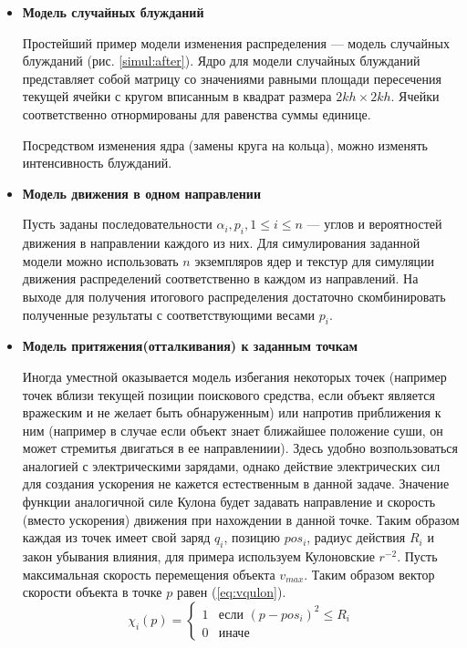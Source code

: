 \begin{itemize}
\item{
\textbf{Модель случайных блужданий}

Простейший пример модели изменения распределения --- модель случайных блужданий
(рис. \ref{simul:after}). Ядро для модели случайных блужданий представляет собой матрицу со
значениями равными площади пересечения текущей ячейки с кругом вписанным в квадрат размера
$2kh \times 2kh$. Ячейки соответственно отнормированы для равенства суммы единице.

Посредством изменения ядра (замены круга на кольца), можно изменять интенсивность блужданий.
}
\item{
\textbf{Модель движения в одном направлении}

Пусть заданы последовательности $\alpha_i, p_i, 1 \le i \le n$ --- углов и вероятностей
движения в направлении каждого из них. Для симулирования заданной модели можно
использовать $n$ экземпляров ядер и текстур для симуляции движения распределений
соответственно в каждом из направлений. На выходе для получения итогового распределения
достаточно скомбинировать полученные результаты с соответствующими весами $p_i$.
}
\item{
\textbf{Модель притяжения(отталкивания) к заданным точкам}

Иногда уместной оказывается модель избегания некоторых точек (например точек вблизи
текущей позиции поискового средства, если объект является вражеским и не желает быть
обнаруженным) или напротив приближения к ним (например в случае если объект знает ближайшее
положение суши, он может стремитья двигаться в ее направлениии). Здесь 
удобно возпользоваться аналогией с электрическими зарядами, однако действие электрических
сил для создания ускорения не кажется естественным в данной задаче. Значение функции
аналогичной силе Кулона будет задавать направление и скорость (вместо ускорения) движения
 при нахождении в данной точке. Таким образом каждая из точек имеет свой заряд $q_i$,
 позицию $pos_i$, радиус действия $R_i$ и закон убывания влияния, для примера используем
 Кулоновские $r^{-2}$. Пусть максимальная скорость перемещения объекта $v_{max}$.
Таким образом вектор скорости объекта в точке $p$ равен (\ref{eq:vqulon}).
\begin{equation}
  \chi_i(p) = 
  \left\{
    \begin{array}{ll}
      1 & \mbox{если } {(p - pos_i)^2 \le R_i} \\
      0 & \mbox{иначе }
    \end{array}
  \right.
\end{equation}

}
\end{itemize}
